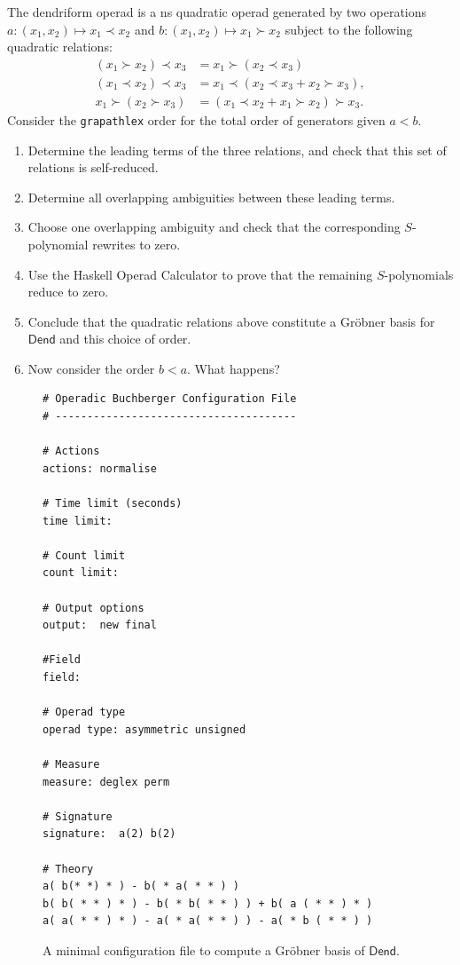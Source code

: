 \documentclass[fleqn, a4paper, twoside]{article}
\newcommand{\0}{\langle 0\rangle}
\newenvironment{tenumerate}{
 \begin{enumerate}
  \setlength{\itemsep}{0pt}
  \setlength{\parskip}{0pt}
}{\end{enumerate}}
\DeclareRobustCommand{\[}{\begin{equation}}%
\DeclareRobustCommand{\]}{\end{equation}}%
\theoremstyle{mytheorem}
\theoremstyle{introthm}
\theoremstyle{mydefinition}
\theoremstyle{mydefinition2}
\theoremstyle{plain} %
\newcommand{\?}{\,?\,}
\theoremstyle{mytheorem}
\theoremstyle{plain} %
\begin{document}
\begin{question} The dendriform operad is a ns quadratic operad
generated by two operations $a: (x_1,x_2)\mapsto x_1\prec x_2$ and $
b: (x_1,x_2) \mapsto x_1\succ x_2$ subject to the following
quadratic relations:
\begin{align*}
(x_1\succ x_2)\prec x_3 &= x_1 \succ (x_2\prec x_3) \\
(x_1  \prec x_2) \prec x_3 &=x_1 \prec (x_2 \prec x_3 +x_2 \succ x_3),\\
x_1 \succ (x_2 \succ x_3) &= (x_1 \prec x_2 +x_1 \succ x_2) \succ x_3  .
\end{align*}
Consider the \texttt{grapathlex} order for the total order of
generators given $a < b$.
\begin{tenumerate}
\item Determine the leading terms of the three relations, and
check that this set of relations is self-reduced.
\item Determine all overlapping ambiguities between these
leading terms.
\item Choose one overlapping ambiguity and check that the
corresponding $S$-polynomial rewrites to zero.
\item Use the Haskell Operad Calculator to prove that the
remaining $S$-polynomials reduce to zero.
\item Conclude that
the quadratic relations above constitute a Gr\"obner basis for
$\mathsf{Dend}$ and this choice of order.
\item Now consider the order $b < a$. What happens?
\end{tenumerate}
\end{question}
\begin{figure}
\begin{verbatim}
# Operadic Buchberger Configuration File
# --------------------------------------

# Actions
actions: normalise 

# Time limit (seconds)
time limit: 

# Count limit
count limit: 

# Output options	
output:  new final  

#Field
field: 

# Operad type
operad type: asymmetric unsigned

# Measure 
measure: deglex perm

# Signature
signature:  a(2) b(2)

# Theory 
a( b(* *) * ) - b( * a( * * ) )
b( b( * * ) * ) - b( * b( * * ) ) + b( a ( * * ) * )
a( a( * * ) * ) - a( * a( * * ) ) - a( * b ( * * ) )
\end{verbatim}
\caption{A minimal configuration file to compute a Gr\"obner basis of
$\mathsf{Dend}$.}
\end{figure}
\end{document}
